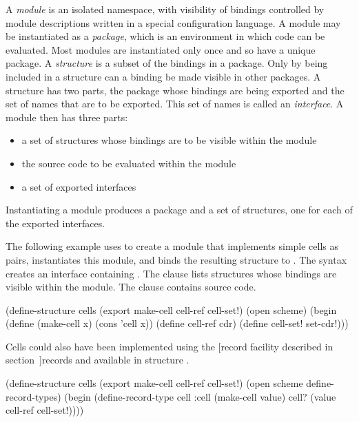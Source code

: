 
A {\em module} is an isolated namespace, with visibility of bindings
 controlled by module descriptions written in a special
 configuration language.
A module may be instantiated as a {\em package}, which is an environment
 in which code can be evaluated.
Most modules are instantiated only once and so have a unique package.
A {\em structure} is a subset of the bindings in a package.
Only by being included in a structure can a binding be
 made visible in other packages.
A structure has two parts, the package whose bindings are being exported
 and the set of names that are to be exported.
This set of names is called an {\em interface}.
A module then has three parts:
\begin{itemize}
\item a set of structures whose bindings are to be visible within the module
\item the source code to be evaluated within the module
\item a set of exported interfaces
\end{itemize}
Instantiating a module produces a package and a set of structures, one for
 each of the exported interfaces.

The following example uses  to create a module that
 implements simple cells as pairs, instantiates this module, and binds the
 resulting structure to .
The syntax  creates an interface
 containing .
The  clause lists structures whose bindings are visible
 within the module.
The  clause contains source code.
\begin{example}
(define-structure cells (export make-cell
                                cell-ref
                                cell-set!)
  (open scheme)
  (begin (define (make-cell x)
           (cons 'cell x))
         (define cell-ref cdr)
         (define cell-set! set-cdr!)))
\end{example}

Cells could also have been implemented using the
[record facility described in section~\Ref]{records}
 and available in structure .
\begin{example}
(define-structure cells (export make-cell
                                cell-ref
                                cell-set!)
  (open scheme define-record-types)
  (begin (define-record-type cell :cell
           (make-cell value)
           cell?
           (value cell-ref cell-set!))))
\end{example}

